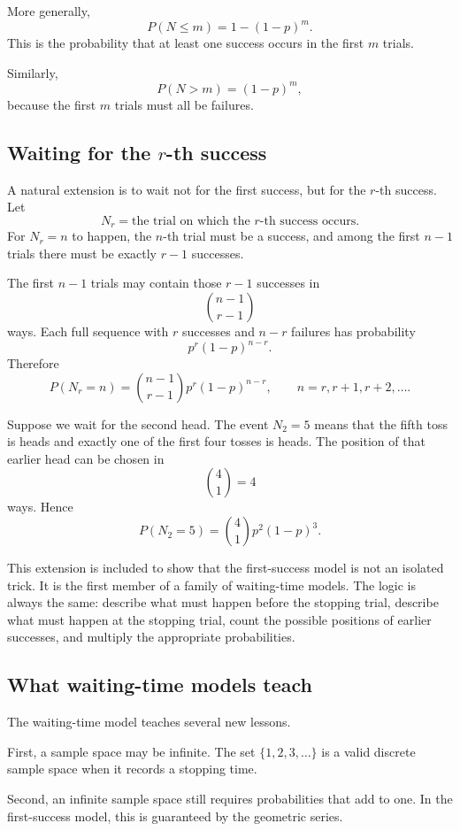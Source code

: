 More generally,
\[
P(N\leq m)=1-(1-p)^m.
\]
This is the probability that at least one success occurs in the first \(m\)
trials.

Similarly,
\[
P(N>m)=(1-p)^m,
\]
because the first \(m\) trials must all be failures.

\subsection*{Waiting for the \(r\)-th success}

A natural extension is to wait not for the first success, but for the \(r\)-th
success. Let
\[
N_r=\text{the trial on which the }r\text{-th success occurs}.
\]
For \(N_r=n\) to happen, the \(n\)-th trial must be a success, and among the
first \(n-1\) trials there must be exactly \(r-1\) successes.

The first \(n-1\) trials may contain those \(r-1\) successes in
\[
\binom{n-1}{r-1}
\]
ways. Each full sequence with \(r\) successes and \(n-r\) failures has
probability
\[
p^r(1-p)^{n-r}.
\]
Therefore
\[
P(N_r=n)=\binom{n-1}{r-1}p^r(1-p)^{n-r},
\qquad n=r,r+1,r+2,\ldots.
\]

\begin{examplebox}
Suppose we wait for the second head. The event \(N_2=5\) means that the fifth
toss is heads and exactly one of the first four tosses is heads. The position of
that earlier head can be chosen in
\[
\binom41=4
\]
ways. Hence
\[
P(N_2=5)=\binom41 p^2(1-p)^3.
\]
\end{examplebox}

This extension is included to show that the first-success model is not an
isolated trick. It is the first member of a family of waiting-time models. The
logic is always the same: describe what must happen before the stopping trial,
describe what must happen at the stopping trial, count the possible positions of
earlier successes, and multiply the appropriate probabilities.

\subsection*{What waiting-time models teach}

The waiting-time model teaches several new lessons.

First, a sample space may be infinite. The set \(\{1,2,3,\ldots\}\) is a valid
discrete sample space when it records a stopping time.

Second, an infinite sample space still requires probabilities that add to one.
In the first-success model, this is guaranteed by the geometric series.

